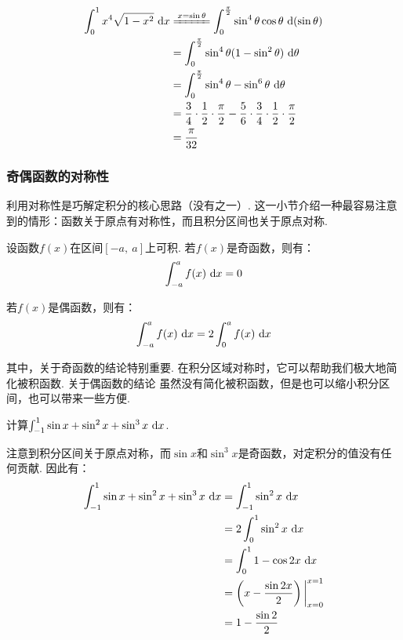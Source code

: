 \begin{solution}
\begin{equation}
    \begin{aligned}
        \int_{0}^{1} x^4\sqrt{1-x^2}~\d x
        &\xlongequal{x = \sin \theta} \int_{0}^{\frac{\pi}{2}} \sin^4 \theta \cos \theta ~\d (\sin \theta) \\
        &= \int_{0}^{\frac{\pi}{2}} \sin^4 \theta (1-\sin^2 \theta) ~\d \theta \\
        &= \int_{0}^{\frac{\pi}{2}} \sin^4 \theta -\sin^6 \theta ~\d \theta \\
        &= \frac{3}{4} \cdot \frac{1}{2} \cdot \frac{\pi}{2} - \frac{5}{6} \cdot \frac{3}{4} \cdot \frac{1}{2} \cdot \frac{\pi}{2} \\
        &= \frac{\pi}{32}
        \nonumber
    \end{aligned}
\end{equation}
\end{solution}

\subsubsection{奇偶函数的对称性}\par
利用对称性是巧解定积分的核心思路（没有之一）. 这一小节介绍一种最容易注意到的情形：函数关于原点有对称性，而且积分区间也关于原点对称.\par
设函数$f(x)$在区间$[-a,~a]$上可积. 若$f(x)$是奇函数，则有：
$$
\setlength\abovedisplayskip{10pt}
\setlength\belowdisplayskip{10pt}
\int_{-a}^{a} f(x)~\d x =0
$$\par
若$f(x)$是偶函数，则有：
$$
\setlength\abovedisplayskip{10pt}
\setlength\belowdisplayskip{10pt}
\int_{-a}^{a} f(x)~\d x = 2\int_{0}^{a} f(x)~\d x
$$\par
其中，关于奇函数的结论特别重要. 在积分区域对称时，它可以帮助我们极大地简化被积函数. 关于偶函数的结论
虽然没有简化被积函数，但是也可以缩小积分区间，也可以带来一些方便.

\begin{example}
\label{ex:ch03-31}
计算$\int_{-1}^{1} \sin x + \sin^2 x + \sin^3 x ~\mathrm{d} x$.
\end{example}

\begin{solution}
注意到积分区间关于原点对称，而$\sin x$和$\sin^3 x$是奇函数，对定积分的值没有任何贡献. 因此有：
\begin{equation}
    \begin{aligned}
        \int_{-1}^{1} \sin x + \sin^2 x + \sin^3 x ~\mathrm{d} x
        &= \int_{-1}^{1} \sin^2 x ~\mathrm{d} x \\
        &= 2 \int_{0}^{1} \sin^2 x ~\mathrm{d} x \\
        &=  \int_{0}^{1} 1 - \cos 2x ~\mathrm{d} x\\
        &= \left( x - \frac{\sin 2x}{2} \right) \bigg|_{x=0}^{x=1} \\
        &= 1- \frac{\sin 2}{2}
        \nonumber
    \end{aligned}
\end{equation}
\end{solution}


